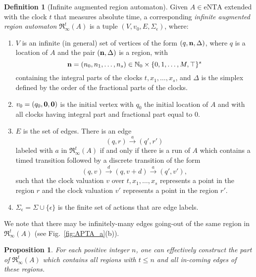 \documentclass[11pt]{amsart}
\newtheorem{proposition}[theorem]{Proposition}
\theoremstyle{definition}
\newtheorem{definition}[theorem]{Definition}
\newcommand{\IARRR}{\mathfrak{R}_{\infty}^{t}}
\newcommand{\ntaeps}{\mathrm{eNTA}}
\newcommand{\eActions}{\Sigma_{\epsilon}}
\newcommand{\ZNaturals}{\mathbb{N}_0}
\begin{document}
\begin{definition}[Infinite augmented region automaton]
	\label{def:inf_aug_region_automaton}
	Given $A \in \ntaeps$ extended with the clock $t$ that measures absolute time, a corresponding \emph{infinite augmented region automaton} $\IARRR(A)$ is a tuple $(V, v_0, E, \eActions)$, where:
	\begin{enumerate}
		\item $V$ is an infinite (in general) set of vertices of the form $(q, {\bf n}, \Delta)$, where $q$ is a location of $A$ and the pair $({\bf n}, \Delta)$ is a region, with
		\begin{equation}
			{\bf n} = (n_0, n_1, \ldots, n_s) \in \ZNaturals \times \{0, 1, \ldots, M, \top \}^{s}
		\end{equation}
		containing the integral parts of the clocks $t, x_1, \ldots, x_s$, and $\Delta$
		is the simplex defined by the order of the fractional parts of the clocks.
		\item $v_0 = (q_0, {\bf 0}, {\bf 0})$ is the initial vertex with $q_0$ the initial location of $A$ and with all clocks having integral part and fractional part equal to 0.
		\item $E$ is the set of edges.
		There is an edge
		\begin{equation}
		(q, r) \xrightarrow{a} (q',r')
		\end{equation}
		labeled with $a$ in $\IARRR(A)$ if and only if there is a run of $A$  which contains a timed transition followed by a discrete transition of the form
		\begin{equation}
		(q, v) \xrightarrow{d} (q, v + d) \xrightarrow{a} (q', v'),
		\label{eq:regtrans}
		\end{equation}
		such that the clock valuation $v$ over $t, x_1, \ldots, x_s$ represents a point in the region $r$ and the clock valuation $v'$ represents a point in the region $r'$.
		\item $\eActions = \Sigma \cup \{\epsilon\}$ is the finite set of actions that are edge labels.
	\end{enumerate}
\end{definition}
We note that there may be infinitely-many edges going-out of the same region in $\IARRR(A)$ (see Fig.~\ref{fig:APTA_a}(b)).
\begin{proposition}
	\label{prop:finite_IARA}
	For each positive integer $n$, one can effectively construct the part of $\IARRR(A)$ which contains all regions with $t \leq n$ and all in-coming edges of these regions. 
\end{proposition}
\end{document}
